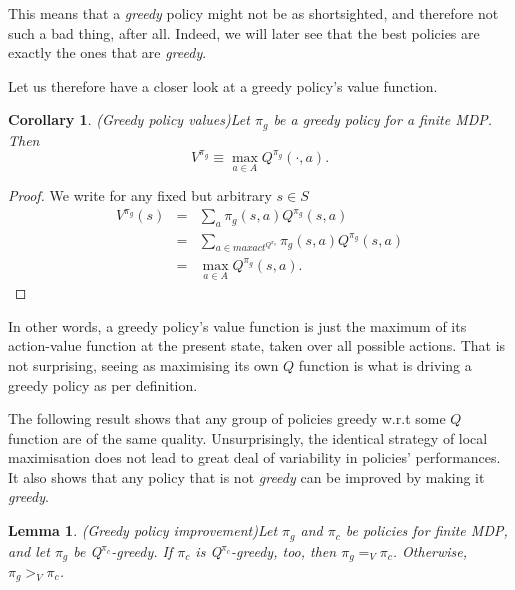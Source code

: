 \documentclass[11pt]{article} %
\newtheorem{lem}{Lemma}
\newtheorem{cor}{Corollary}
\begin{document}
This means that a \textit{greedy} policy might not be as shortsighted, and therefore not such a bad thing, after all. Indeed, we will later see that the best policies are exactly the ones that are \textit{greedy}.

Let us therefore have a closer look at a greedy policy's value function.

\begin{cor}{(Greedy policy values)}\label{cor_greedPolVals}
	Let $\pi_g$ be a \textit{greedy} policy for a finite MDP. Then $$V^{\pi_g} \equiv \max\limits_{a \in A} Q^{\pi_g}(\cdot,a).$$
\end{cor}

\begin{proof}
	We write for any fixed but arbitrary $s \in S$
	\[
		\begin{array}{rll}
			V^{\pi_g}(s) 	& = 	& \sum_a \pi_g(s,a) Q^{\pi_g}(s,a) \\
						& =	& \sum_{a \in maxact^{Q^{\pi_g}}} \pi_g(s,a) Q^{\pi_g}(s,a) \\
						& = 	& \max_{a \in A} Q^{\pi_g}(s,a).
		\end{array}
	\]
\end{proof}

In other words, a greedy policy's value function is just the maximum of its action-value function at the present state, taken over all possible actions. That is not surprising, seeing as maximising its own $Q$ function is what is driving a greedy policy as per definition.

The following result shows that any group of policies greedy w.r.t some $Q$ function are of the same quality. Unsurprisingly, the identical strategy of local maximisation does not lead to great deal of variability in policies' performances. It also shows that any policy that is not \textit{greedy} can be improved by making it \textit{greedy}.

\begin{lem}{(Greedy policy improvement)}\label{lem_greedPolImp}
Let $\pi_g$ and $\pi_c$  be policies for finite MDP, and let $\pi_g$ be \textit{Q}$^{\pi_c}$\textit{-greedy}. If $\pi_c$ is \textit{Q}$^{\pi_c}$\textit{-greedy}, too, then $\pi_g =_V \pi_c$. Otherwise, $\pi_g >_V \pi_c$.
\end{lem}
\end{document}
